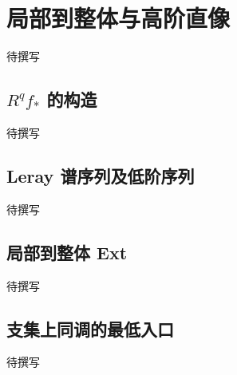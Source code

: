 
% 
% 

\section{局部到整体与高阶直像}
\label{g5:sec:1804}

待撰写

\subsection{\texorpdfstring{\(R^q f_*\) 的构造}{Rᵠf\_* 的构造}}
\label{g5:subsec:1804:01}
待撰写

\subsection{Leray 谱序列及低阶序列}
\label{g5:subsec:1804:02}
待撰写

\subsection{局部到整体 Ext}
\label{g5:subsec:1804:03}
待撰写

\subsection{支集上同调的最低入口}
\label{g5:subsec:1804:04}
待撰写
